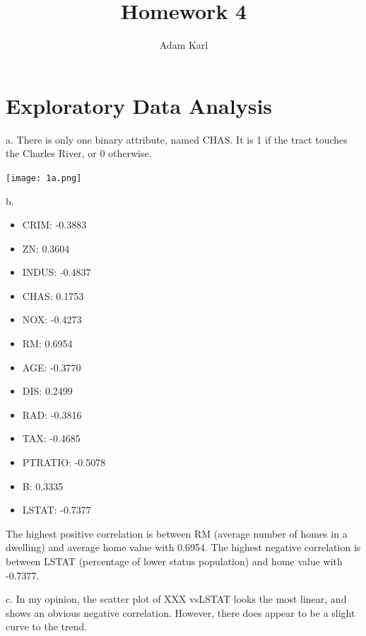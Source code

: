 \documentclass[a4paper]{article}
\title{Homework 4}
\author{Adam Karl}
\begin{document}
\maketitle

\section{Exploratory Data Analysis}

\noindent
a. There is only one binary attribute, named CHAS. It is 1 if the tract touches the Charles River, or 0 otherwise.

\begin{center}
    \texttt{[image: 1a.png]}
\end{center}

\noindent 
b. 

\begin{itemize}
    \item CRIM: -0.3883
    \item ZN: 0.3604
    \item INDUS: -0.4837
    \item CHAS: 0.1753
    \item NOX: -0.4273
    \item RM: 0.6954
    \item AGE: -0.3770
    \item DIS: 0.2499
    \item RAD: -0.3816
    \item TAX: -0.4685
    \item PTRATIO: -0.5078
    \item B: 0.3335
    \item LSTAT: -0.7377
\end{itemize}

The highest positive correlation is between RM (average number of homes in a dwelling) and average home value with 0.6954. The highest negative correlation is between LSTAT (percentage of lower status population) and home value with -0.7377.


\noindent
c. In my opinion, the scatter plot of XXX vsLSTAT looks the most linear, and shows an obvious negative correlation. However, there does appear to be a slight curve to the trend.
\end{document}
